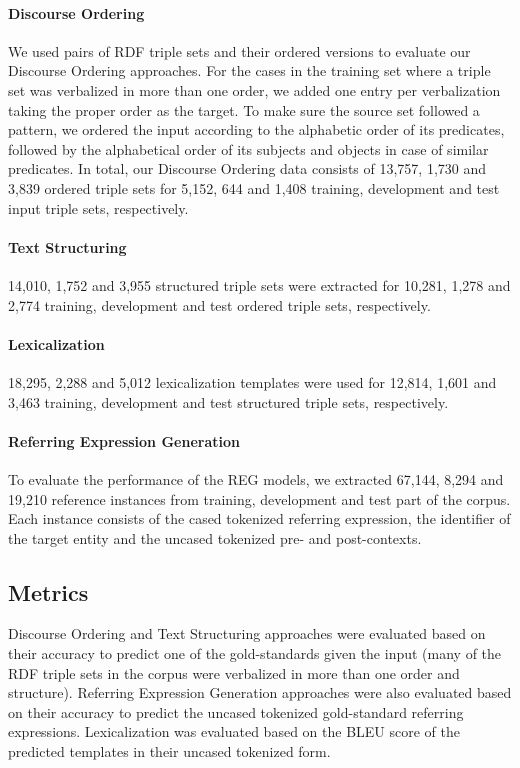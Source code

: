 \documentclass[11pt,a4paper]{article}
\begin{document}
\paragraph{Discourse Ordering} We used pairs of RDF triple sets and their ordered versions to evaluate our Discourse Ordering approaches. For the cases in the training set where a triple set was verbalized in more than one order, we added one entry per verbalization taking the proper order as the target. To make sure the source set followed a pattern, we ordered the input according to the alphabetic order of its predicates, followed by the alphabetical order of its subjects and objects in case of similar predicates. In total, our Discourse Ordering data consists of 13,757, 1,730 and 3,839 ordered triple sets for 5,152, 644 and 1,408 training, development and test input triple sets, respectively. 

\paragraph{Text Structuring} 14,010, 1,752 and 3,955 structured triple sets were extracted for 10,281, 1,278 and 2,774 training, development and test ordered triple sets, respectively.

\paragraph{Lexicalization} 18,295, 2,288 and 5,012 lexicalization templates were used for 12,814, 1,601 and 3,463 training, development and test structured triple sets, respectively.

\paragraph{Referring Expression Generation} To evaluate the performance of the REG models, we extracted 67,144, 8,294 and 19,210 reference instances from training, development and test part of the corpus. Each instance consists of the cased tokenized referring expression, the identifier of the target entity and the uncased tokenized pre- and post-contexts.

\subsection{Metrics}

Discourse Ordering and Text Structuring approaches were evaluated based on their accuracy to predict one of the gold-standards given the input (many of the RDF triple sets in the corpus were verbalized in more than one order and structure). Referring Expression Generation approaches were also evaluated based on their accuracy to predict the uncased tokenized gold-standard referring expressions. Lexicalization was evaluated based on the BLEU score of the predicted templates in their uncased tokenized form.
\end{document}
